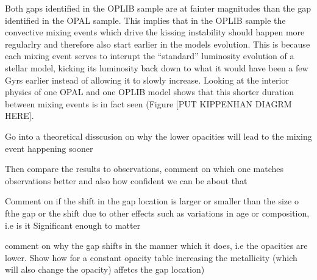 Both gaps identified in the OPLIB sample are at fainter magnitudes than the gap
identified in the OPAL sample. This implies that in the OPLIB sample the
convective mixing events which drive the kissing instability should happen more
regularlry and therefore also start earlier in the models evolution. This is
because each mixing event serves to interupt the ``standard'' luminosity
evolution of a stellar model, kicking its luminosity back down to what it would
have been a few Gyrs earlier instead of allowing it to slowly increase. Looking
at the interior physics of one OPAL and one OPLIB model shows that this shorter
duration between mixing events is in fact seen (Figure {\color{red} [PUT
KIPPENHAN DIAGRM HERE]}.


{\color{red} Go into a theoretical disscusion on why the lower opacities will
lead to the mixing event happening sooner}

{\color{red} Then compare the results to observations, comment on which one
matches observations better and also how confident we can be about that}

{\color{red} Comment on if the shift in the gap location is larger or smaller
than the size o fthe gap or the shift due to other effects such as variations
in age or composition, i.e is it Significant enough to matter}

{\color{red} comment on why the gap shifts in the manner which it does, i.e the
opacities are lower. Show how for a constant opacity table increasing the
metallicity (which will also change the opacity) affetcs the gap location)}
